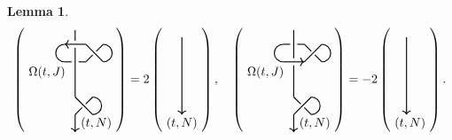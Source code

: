 \documentclass[12pt]{amsart}
\newtheorem{lemma}[theo]{Lemma}
\begin{document}
\begin{lemma}
\label{up-down}
\begin{align*}
\left(\begin{tikzpicture}[baseline=-0.65ex, thick, scale=1]
\draw (0,-0.5) to (0,0.9);
\draw (0,1.1) to (0,1.4);
\draw (-0.3,1) [<-]to (0.3,1);
\draw (-0.3,0.5) to (-0.1,0.5);
\draw (0.1,0.5) to (0.3,0.5);
\draw  (-0.3,1) arc (90:270:0.25);
\draw (0.3,1) to (0.8,0.5);
\draw (0.3,0.5) to (0.5,0.7);
\draw (0.8,1) to (0.6,0.8);
\draw (0,-0.5) to (0.5,-1);
\draw (0.8,0.5) arc (-90:90:0.25);
\draw (0,-1) to (0.2,-0.8);
\draw (0.3,-0.7) to (0.5,-0.5);
\draw (0.5,-1) arc (-90:90:0.25);
\draw (0,-1) [->]  to (0,-1.5);
\draw (0.6,-1.25) node {$(t, N)$};
\draw (-0.8,0.2) node {$\Omega(t, J)$};
\end{tikzpicture}\right)=2\left(\begin{tikzpicture}[baseline=-0.65ex, thick, scale=1]
\draw (0.5,-1) [<-]  to (0.5,1.2);
\draw (0.5,-1.25) node {$(t, N)$};
\end{tikzpicture}\right),\quad
\left(\begin{tikzpicture}[baseline=-0.65ex, thick, scale=1]
\draw (0,-0.5) to (0,0.4);
\draw (0,0.6) to (0,1.4);
\draw (-0.3,0.5) [->]to (0.3,0.5);
\draw (-0.3,1) to (-0.1,1);
\draw (0.1,1) to (0.3,1);
\draw  (-0.3,1) arc (90:270:0.25);
\draw (0.3,1) to (0.5,0.8);
\draw (0.6,0.7) to (0.8,0.5);
\draw (0.3,0.5) to (0.8,1);
\draw (0,-0.5) to (0.2,-0.7);
\draw (0.3,-0.8) to (0.5,-1);
\draw (0.8,0.5) arc (-90:90:0.25);
\draw (0,-1) to (0.5,-0.5);
\draw (0.5,-1) arc (-90:90:0.25);
\draw (0,-1) [->]  to (0,-1.5);
\draw (0.6,-1.25) node {$(t, N)$};
\draw (-0.8,0.2) node {$\Omega(t, J)$};
\end{tikzpicture}\right)=-2\left(\begin{tikzpicture}[baseline=-0.65ex, thick, scale=1]
\draw (0.5,-1) [<-]  to (0.5,1.2);
\draw (0.6,-1.25) node {$(t, N)$};
\end{tikzpicture}\right).
\end{align*}
\end{lemma}
\end{document}
